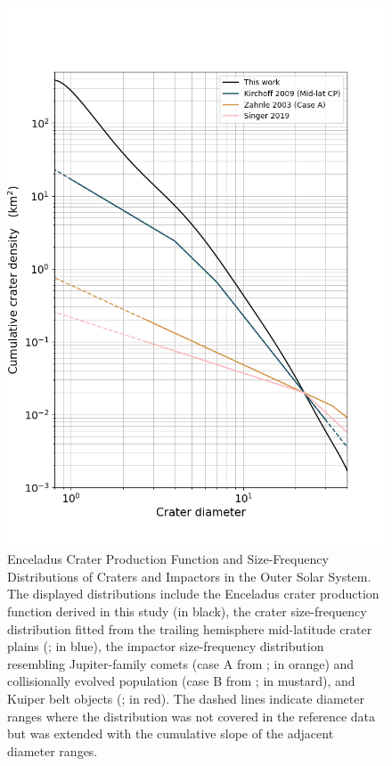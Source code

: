 \documentclass[preprint,12pt,3p,times,authoryear]{elsarticle}
\begin{document}
\begin{figure}
    \centering
    \includegraphics[width=0.5\linewidth]{compare_enc_terrains_degpoly_FigS3.png}
    \caption{Enceladus Crater Production Function and Size-Frequency Distributions of Craters and Impactors in the Outer Solar System. The displayed distributions include the Enceladus crater production function derived in this study (in black), the crater size-frequency distribution fitted from the trailing hemisphere mid-latitude crater plains (\citet{Kirchoff2009}; in blue), the impactor size-frequency distribution resembling Jupiter-family comets (case A from \citet{Zahnle2003}; in orange) and collisionally evolved population (case B from \citet{Zahnle2003}; in mustard), and Kuiper belt objects (\citet{Singer2019}; in red). The dashed lines indicate diameter ranges where the distribution was not covered in the reference data but was extended with the cumulative slope of the adjacent diameter ranges.}
    \label{fig:cpf_compare}
\end{figure}
\end{document}
